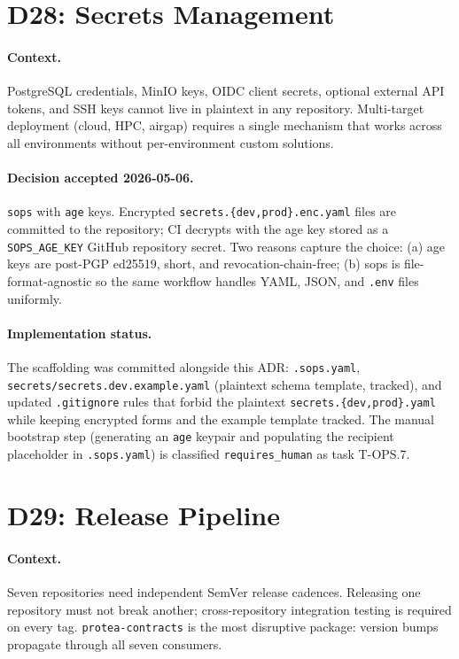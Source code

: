 \section{D28: Secrets Management}
\label{app:adr-d28}

\paragraph{Context.}
PostgreSQL credentials, MinIO keys, OIDC client secrets, optional external API
tokens, and SSH keys cannot live in plaintext in any repository.
Multi-target deployment (cloud, HPC, airgap) requires a single mechanism that
works across all environments without per-environment custom solutions.

\paragraph{Decision accepted 2026-05-06.}
\texttt{sops} with \texttt{age} keys. Encrypted
\texttt{secrets.\{dev,prod\}.enc.yaml} files are committed to the repository;
CI decrypts with the age key stored as a \texttt{SOPS\_AGE\_KEY} GitHub
repository secret. Two reasons capture the choice: (a) age keys are
post-PGP ed25519, short, and revocation-chain-free; (b) sops is
file-format-agnostic so the same workflow handles YAML, JSON, and
\texttt{.env} files uniformly.

\paragraph{Implementation status.}
The scaffolding was committed alongside this ADR: \texttt{.sops.yaml},
\texttt{secrets/secrets.dev.example.yaml} (plaintext schema template,
tracked), and updated \texttt{.gitignore} rules that forbid the plaintext
\texttt{secrets.\{dev,prod\}.yaml} while keeping encrypted forms and
the example template tracked. The manual bootstrap step (generating an
\texttt{age} keypair and populating the recipient placeholder in
\texttt{.sops.yaml}) is classified \texttt{requires\_human} as task T-OPS.7.

\section{D29: Release Pipeline}
\label{app:adr-d29}

\paragraph{Context.}
Seven repositories need independent SemVer release cadences. Releasing one
repository must not break another; cross-repository integration testing is
required on every tag. \texttt{protea-contracts} is the most disruptive
package: version bumps propagate through all seven consumers.

